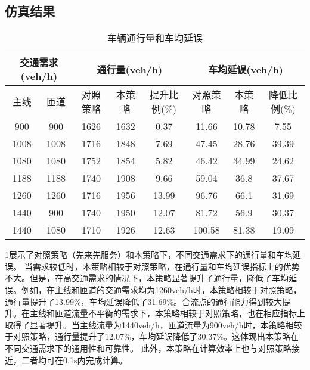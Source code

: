 \subsection{仿真结果}
\begin{table}[]
    \begin{tabular}{cccccccc}
    \hline
    \multicolumn{2}{c}{交通需求(veh/h)} & \multicolumn{3}{c}{通行量(veh/h)} & \multicolumn{3}{c}{车均延误(veh/h)} \\ \hline
    主线              & 匝道              & 对照策略    & 本策略     & 提升比例(\%)    & 对照策略      & 本策略     & 降低比例(\%)   \\ \hline
    900             & 900             & 1626    & 1632    & 0.37        & 11.66     & 10.78   & 7.55       \\
    1008            & 1008            & 1716    & 1848    & 7.69        & 47.45     & 28.76   & 39.39      \\
    1080            & 1080            & 1752    & 1854    & 5.82        & 46.42     & 34.99   & 24.62      \\
    1188            & 1188            & 1740    & 1908    & 9.66        & 59.04     & 36.8    & 37.67      \\
    1260            & 1260            & 1716    & 1956    & 13.99       & 96.76     & 66.1    & 31.69      \\ \hline
    1440            & 900             & 1740    & 1950    & 12.07       & 81.72     & 56.9    & 30.37      \\
    1440            & 1080            & 1710    & 1926    & 12.63       & 100.58    & 81.38   & 19.09      \\
    \hline
    \end{tabular}
    \caption{车辆通行量和车均延误}
    \label{tab:sim_res}
    \end{table}

\ref{tab:sim_res}展示了对照策略（先来先服务）和本策略下，不同交通需求下的通行量和车均延误。
当需求较低时，本策略相较于对照策略，在通行量和车均延误指标上的优势不大。但是，在高交通需求的情况下，本策略显著提升了通行量，降低了车均延误。例如，在主线和匝道的交通需求均为1260veh/h时，本策略相较于对照策略，通行量提升了13.99\%，车均延误降低了31.69\%。合流点的通行能力得到较大提升。在主线和匝道流量不平衡的需求下，本策略相较于对照策略，也在相应指标上取得了显著提升。当主线流量为1440veh/h，匝道流量为900veh/h时，本策略相较于对照策略，通行量提升了12.07\%，车均延误降低了30.37\%。这体现出本策略在不同交通需求下的通用性和可靠性。
此外，本策略在计算效率上也与对照策略接近，二者均可在0.1s内完成计算。
